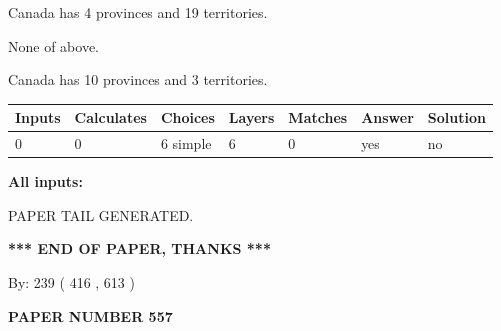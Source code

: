 \documentclass[12pt]{article}
\begin{document}
 
Canada has   4 provinces and  19 territories.
 
 
 None of above.
 
 
\noindent{}
 
 
Canada has 10  provinces and 3 territories.
 
 
\noindent{}
 
 
   
   
   
   
\noindent\begin{tabular}{|l|l|l|l|l|l|l|}
 \hline
Inputs & Calculates & Choices & Layers & Matches & Answer & Solution \\ \hline
 0  & 
 0  & 
 6
  simple  
  & 
 6  & 
 0  & 
  yes & 
  no 
  \\ \hline
 \end{tabular}
   
   
   
   
\noindent{}
   
   
   
   
\noindent\vspace{0.1in}\hspace{-0.08in} {\textbf{\Large{All inputs: }}}
   
   
   
   
   
   
 \vspace{0.2in}
 
   
   
\vspace{2.0in} PAPER TAIL GENERATED.
   
   
   
   
\vspace{1.0in} 
{\textbf{\large{ *** END OF PAPER, THANKS *** }}} 
   
   
\hspace{1.0in} By: 
 239 ( 416 ,  613 )
   
   
   
   
\newpage 
\setcounter{page}{ 
   557001 } 
   
   
   
   
 {\textbf{ \Large{ PAPER NUMBER  557  }}}
   
\end{document}
